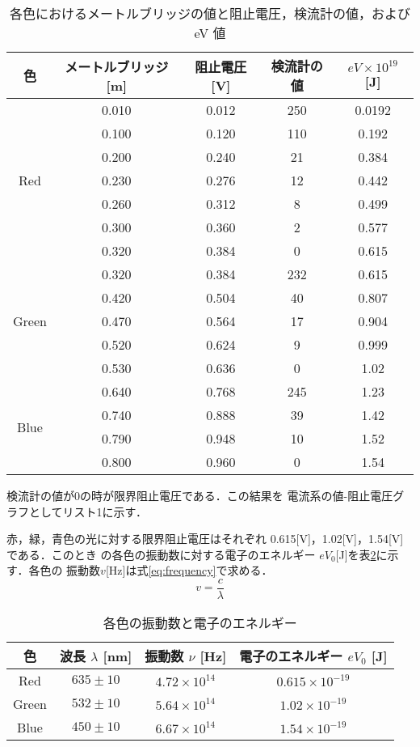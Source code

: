 \documentclass[a4paper,11pt,dvipdfmx]{jsarticle}
\begin{document}
\begin{table}[H]
\centering
\caption{各色におけるメートルブリッジの値と阻止電圧，検流計の値，および eV 値}
\label{tab:result}
\begin{tabular}{|c|c|c|c|c|}
\hline
色 & メートルブリッジ [m] & 阻止電圧 [V] & 検流計の値 & $eV \times 10^{19}$ [J] \\
\hline
\multirow{7}{*}{Red} 
& 0.010 & 0.012 & 250 & 0.0192 \\
& 0.100 & 0.120 & 110 & 0.192 \\
& 0.200 & 0.240 & 21  & 0.384 \\
& 0.230 & 0.276 & 12  & 0.442 \\
& 0.260 & 0.312 & 8   & 0.499 \\
& 0.300 & 0.360 & 2   & 0.577 \\
& 0.320 & 0.384 & 0   & 0.615 \\
\hline
\multirow{5}{*}{Green}
& 0.320 & 0.384 & 232 & 0.615 \\
& 0.420 & 0.504 & 40  & 0.807 \\
& 0.470 & 0.564 & 17  & 0.904 \\
& 0.520 & 0.624 & 9   & 0.999 \\
& 0.530 & 0.636 & 0   & 1.02 \\
\hline
\multirow{4}{*}{Blue}
& 0.640 & 0.768 & 245 & 1.23 \\
& 0.740 & 0.888 & 39  & 1.42 \\
& 0.790 & 0.948 & 10  & 1.52 \\
& 0.800 & 0.960 & 0   & 1.54 \\
\hline
\end{tabular}
\end{table}

検流計の値が0の時が限界阻止電圧である．この結果を
電流系の値-阻止電圧グラフとしてリスト1に示す．

\newpage

赤，緑，青色の光に対する限界阻止電圧はそれぞれ
0.615[V]，1.02[V]，1.54[V]である．このとき
の各色の振動数に対する電子のエネルギー
$eV_0$[J]を表\ref{tab:frequency}に示す．各色の
振動数$v$[Hz]は式\ref{eq:frequency}で求める．
\begin{equation}
v = \frac{c}{\lambda}
\label{eq:frequency}
\end{equation}

\begin{table}[H]
\centering
\caption{各色の振動数と電子のエネルギー}
\label{tab:frequency}
\begin{tabular}{|c|c|c|c|}
\hline
色 & 波長 $\lambda$ [nm] & 振動数 $\nu$ [Hz] & 電子のエネルギー $eV_0$ [J] \\
\hline
Red   & $635 \pm 10$ & $4.72 \times 10^{14}$ & $0.615 \times 10^{-19}$ \\
Green & $532 \pm 10$ & $5.64 \times 10^{14}$ & $1.02 \times 10^{-19}$ \\
Blue  & $450 \pm 10$ & $6.67 \times 10^{14}$ & $1.54 \times 10^{-19}$ \\
\hline
\end{tabular}
\end{table}
\end{document}
